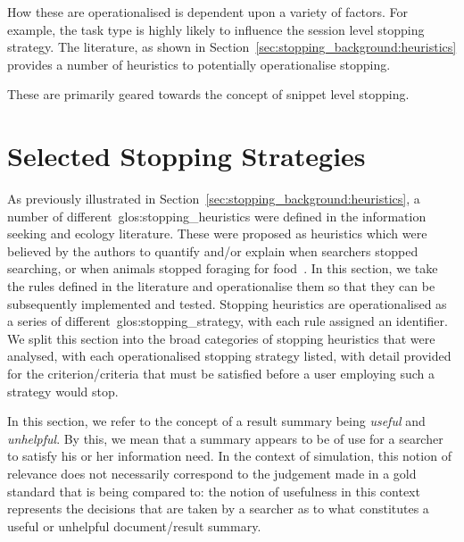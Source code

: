 How these are operationalised is dependent upon a variety of factors. For example, the task type is highly likely to influence the session level stopping strategy. The literature, as shown in Section~\ref{sec:stopping_background:heuristics} provides a number of heuristics to potentially operationalise stopping.

These are primarily geared towards the concept of snippet level stopping.

\section{Selected Stopping Strategies}\label{sec:proposal:strategies}
As previously illustrated in Section~\ref{sec:stopping_background:heuristics}, a number of different~\glspl{glos:stopping_heuristic} were defined in the information seeking and ecology literature. These were proposed as heuristics which were believed by the authors to quantify and/or explain when searchers stopped searching, or when animals stopped foraging for food~\cite{maxwell2015stopping_strategies}. In this section, we take the rules defined in the literature and operationalise them so that they can be subsequently implemented and tested. Stopping heuristics are operationalised as a series of different~\gls{glos:stopping_strategy}, with each rule assigned an identifier. We split this section into the  broad categories of stopping heuristics that were analysed, with each operationalised stopping strategy listed, with detail provided for the criterion/criteria that must be satisfied before a user employing such a strategy would stop. 

\noindent{} In this section, we refer to the concept of a result summary being \emph{useful} and \emph{unhelpful}. By this, we mean that a summary appears to be of use for a searcher to satisfy his or her information need. In the context of simulation, this notion of relevance does not necessarily correspond to the judgement made in a gold standard that is being compared to: the notion of usefulness in this context represents the decisions that are taken by a searcher as to what constitutes a useful or unhelpful document/result summary.

